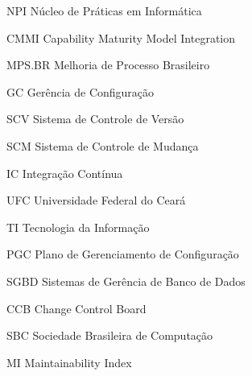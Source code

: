 \begin{siglas}
  \item[NPI] Núcleo de Práticas em Informática
  \item[CMMI] Capability Maturity Model Integration
  \item[MPS.BR] Melhoria de Processo Brasileiro
  \item[GC] Gerência de Configuração
  \item[SCV] Sistema de Controle de Versão
  \item[SCM] Sistema de Controle de Mudança
  \item[IC]  Integração Contínua
  \item[UFC] Universidade Federal do Ceará
  \item[TI] Tecnologia da Informação
  \item[PGC] Plano de Gerenciamento de Configuração
  \item[SGBD] Sistemas de Gerência de Banco de Dados
  \item[CCB] Change Control Board
  \item[SBC] Sociedade Brasileira de Computação
  \item[MI] Maintainability Index 
\end{siglas}
